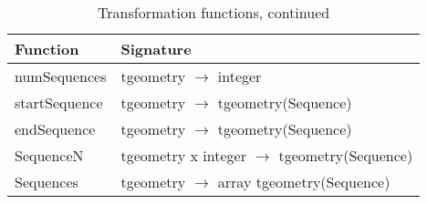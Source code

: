 \clearpage

\begin{table}[htbp]
\ContinuedFloat
\begin{subtable}{1\textwidth}
\centering
    \begin{tabularx}{\textwidth}{|l|X|}
    \hline
    \textbf{Function}   & \textbf{Signature} \\ 
    \hline
    numSequences        & tgeometry $\rightarrow$ integer \\
    \hline
    startSequence       & tgeometry $\rightarrow$ tgeometry(Sequence) \\
    \hline
    endSequence         & tgeometry $\rightarrow$ tgeometry(Sequence) \\
    \hline
    SequenceN           & tgeometry x integer $\rightarrow$ tgeometry(Sequence) \\
    \hline
    Sequences           & tgeometry $\rightarrow$ array tgeometry(Sequence) \\
    \hline
    \end{tabularx}
\end{subtable}
\caption{Transformation functions, continued}
\end{table}